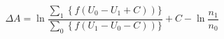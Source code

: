 


\[ \Delta A = \ln \frac{\sum_1\left\{f(U_0 - U_1  +
    C)\right)\}}{\sum_0\left\{f(U_1 - U_0  - C)\right)\}} + C -
\ln\frac{n_1}{n_0} \]


